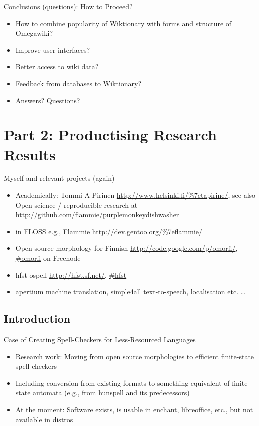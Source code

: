 \documentclass[t,12pt]{beamer}
\begin{document}
\begin{frame}{Conclusions (questions): How to Proceed?}
    \begin{itemize}
        \item How to combine popularity of Wiktionary with forms and structure
            of Omegawiki?
        \item Improve user interfaces?
        \item Better access to wiki data?
        \item Feedback from databases to Wiktionary?
        \item Answers? Questions? 
    \end{itemize}
\end{frame}

\HyTitle

\section{Part 2: Productising Research Results}

\begin{frame}{Myself and relevant projects (again)}
    \begin{itemize}
        \item Academically: Tommi A Pirinen \url{http://www.helsinki.fi/\%7etapirine/}, see also Open science / reproducible research at \url{http://github.com/flammie/purplemonkeydishwasher}
        \item in FLOSS e.g., Flammie \url{http://dev.gentoo.org/\%7eflammie/}
        \item Open source morphology for Finnish \url{http://code.google.com/p/omorfi/}, \url{\#omorfi} on Freenode
        \item hfst-ospell \url{http://hfst.sf.net/}, \url{\#hfst}
        \item apertium machine translation, simple4all text-to-speech, 
            localisation etc. \ldots
    \end{itemize}
\end{frame}

\subsection{Introduction}

\begin{frame}{Case of Creating Spell-Checkers for Less-Resourced Languages}
    \begin{itemize}
        \item Research work: Moving from open source morphologies to efficient
            finite-state spell-checkers
        \item Including conversion from existing formats to something equivalent
            of finite-state automata (e.g., from hunspell and its predecessors)
        \item At the moment: Software exists, is usable in enchant, libreoffice,
            etc., but not available in distros
    \end{itemize}
\end{frame}
\end{document}
